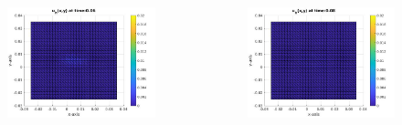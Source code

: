 \documentclass[9pt]{beamer}
\begin{document}
\begin{frame}
\begin{columns}
	    \begin{column}{0.25\textwidth}
		    \begin{figure}[h]
			    \includegraphics[width=\textwidth]{tc1-1/006.jpg}
		\end{figure}
	    \end{column}
	    \begin{column}{0.25\textwidth}
		    \begin{figure}[h]
			    \includegraphics[width=\textwidth]{tc1-1/008.jpg}
		    \end{figure}
	\end{column}
	\end{columns}
    \begin{columns}
    	\begin{column}{0.25\textwidth}

\end{column}
\end{columns}
\end{frame}
\end{document}
